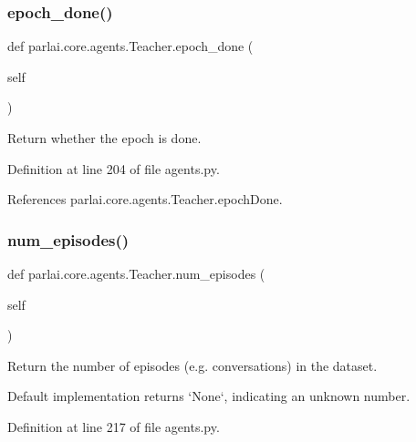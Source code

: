 \subsubsection{\texorpdfstring{epoch\+\_\+done()}{epoch\_done()}}
{\footnotesize\ttfamily def parlai.\+core.\+agents.\+Teacher.\+epoch\+\_\+done (\begin{DoxyParamCaption}\item[{}]{self }\end{DoxyParamCaption})}

\begin{DoxyVerb}Return whether the epoch is done.\end{DoxyVerb}
 

Definition at line 204 of file agents.\+py.



References parlai.\+core.\+agents.\+Teacher.\+epoch\+Done.

\mbox{\label{classparlai_1_1core_1_1agents_1_1Teacher_aa35e171610f8dd8e6a2fd5a87ad91e10}} 
\subsubsection{\texorpdfstring{num\+\_\+episodes()}{num\_episodes()}}
{\footnotesize\ttfamily def parlai.\+core.\+agents.\+Teacher.\+num\+\_\+episodes (\begin{DoxyParamCaption}\item[{}]{self }\end{DoxyParamCaption})}

\begin{DoxyVerb}Return the number of episodes (e.g. conversations) in the dataset.

Default implementation returns `None`, indicating an unknown number.
\end{DoxyVerb}
 

Definition at line 217 of file agents.\+py.



